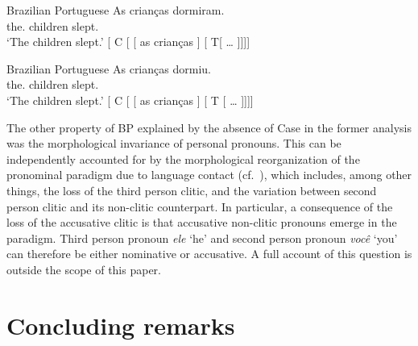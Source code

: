 \documentclass[output=paper]{langsci/langscibook}
\begin{document}
\ea%
    \label{ex:key:14.51}Brazilian Portuguese
	\ea
	\gll    As crianças dormiram.\\
            the.\Pl{} children slept.\Tpl{}\\
    \glt    ‘The children slept.’
    \ex
        {}[ C [ [ as crianças ]
            [ T[ \dots{} ]]]]
    \z
\z

\ea%
    \label{ex:key:14.52}Brazilian Portuguese
	\ea
	\gll    As crianças dormiu.\\
            the.\Pl{} children slept.\Tsg{}\\
    \glt    ‘The children slept.’
    \ex
        {}[ C [ [ as crianças ]
            [ T\tss{} [ \dots{} ]]]]
    \z
\z

The other property of \gls{BP} explained by the absence of Case in the former
analysis was the morphological invariance of personal pronouns. This can be
independently accounted for by the morphological reorganization of the
pronominal paradigm due to language contact (cf.\ ), which
includes, among other things, the loss of the third person clitic, and the
variation between second person clitic and its non-clitic counterpart. In
particular, a consequence of the loss of the accusative clitic is that
accusative non-clitic pronouns emerge in the paradigm. Third person pronoun
\emph{ele} ‘he’ and second person pronoun \emph{você} ‘you’ can therefore be
either nominative or accusative.  A full account of this question is outside
the scope of this paper.

\section{Concluding remarks}\label{sec:key:14.7}
\end{document}
